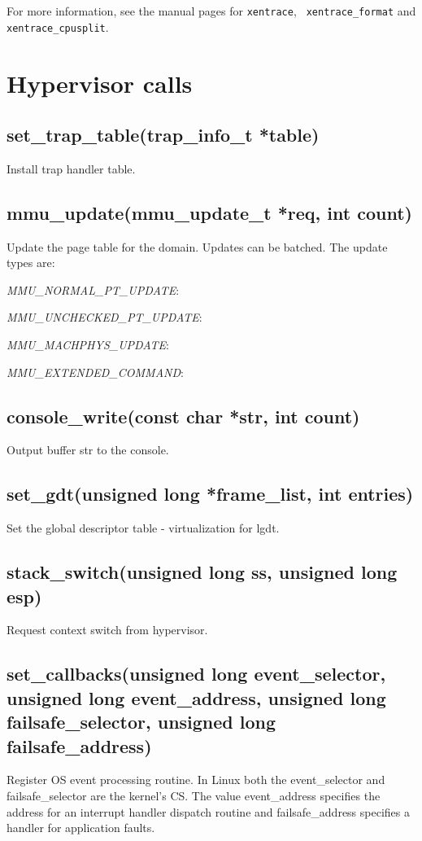 \documentclass[11pt,twoside,final,openright]{xenstyle}
\begin{document}
For more information, see the manual pages for {\tt xentrace}, {\tt
xentrace\_format} and {\tt xentrace\_cpusplit}.


\chapter{Hypervisor calls}

\section{ set\_trap\_table(trap\_info\_t *table)} 

Install trap handler table.

\section{ mmu\_update(mmu\_update\_t *req, int count)} 
Update the page table for the domain. Updates can be batched.
The update types are: 

{\it MMU\_NORMAL\_PT\_UPDATE}:

{\it MMU\_UNCHECKED\_PT\_UPDATE}:

{\it MMU\_MACHPHYS\_UPDATE}:

{\it MMU\_EXTENDED\_COMMAND}:

\section{ console\_write(const char *str, int count)}
Output buffer str to the console.

\section{ set\_gdt(unsigned long *frame\_list, int entries)} 
Set the global descriptor table - virtualization for lgdt.

\section{ stack\_switch(unsigned long ss, unsigned long esp)} 
Request context switch from hypervisor.

\section{ set\_callbacks(unsigned long event\_selector, unsigned long event\_address,
                        unsigned long failsafe\_selector, unsigned long failsafe\_address) } 
 Register OS event processing routine. In Linux both the event\_selector and 
failsafe\_selector are the kernel's CS. The value event\_address specifies the address for
an interrupt handler dispatch routine and failsafe\_address specifies a handler for 
application faults.
\end{document}
